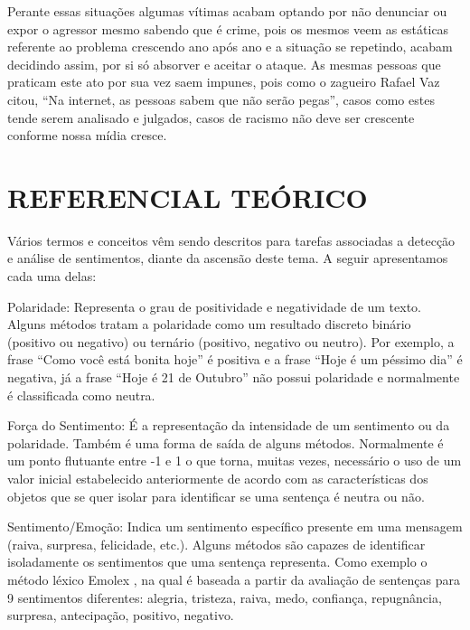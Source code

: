 \documentclass[12pt, a4paper]{article}
\begin{document}
\hspace*{0.8cm}Perante essas situações algumas vítimas acabam optando por não denunciar ou expor o agressor mesmo sabendo que é crime, pois os mesmos veem as estáticas referente ao problema crescendo ano após ano e a situação se repetindo, acabam decidindo assim, por si só absorver e aceitar o ataque.
As mesmas pessoas que praticam este ato por sua vez saem impunes, pois como o zagueiro Rafael Vaz citou, “Na internet, as pessoas sabem que não serão pegas”, casos como estes tende serem analisado e julgados, casos de racismo não deve ser crescente conforme nossa mídia cresce.

\newpage
\section{REFERENCIAL TEÓRICO}	


\hspace*{0.8cm}Vários termos e conceitos vêm sendo descritos para tarefas associadas a detecção e análise de sentimentos, diante da ascensão deste tema. A seguir apresentamos cada uma delas: 

Polaridade: Representa o grau de positividade e negatividade de um texto. Alguns métodos tratam a polaridade como um resultado discreto binário (positivo ou negativo) ou ternário (positivo, negativo ou neutro). Por exemplo, a frase “Como você está bonita hoje” é positiva e a frase “Hoje é um péssimo dia” é negativa, já a frase “Hoje é 21 de Outubro” não possui polaridade e normalmente é classificada como neutra.

Força do Sentimento: É a representação da intensidade de um sentimento ou da polaridade. Também é uma forma de saída de alguns métodos. Normalmente é um ponto flutuante entre -1 e 1 o que torna, muitas vezes, necessário o uso de um valor inicial estabelecido anteriormente de acordo com as características dos objetos que se quer isolar para identificar se uma sentença é neutra ou não.

Sentimento/Emoção: Indica um sentimento específico presente em uma mensagem (raiva, surpresa, felicidade, etc.). Alguns métodos são capazes de identificar isoladamente os sentimentos que uma sentença representa. Como exemplo o método léxico Emolex \cite{Mohammad}, na qual é baseada a partir da avaliação de sentenças para 9 sentimentos diferentes: alegria, tristeza, raiva, medo, confiança, repugnância, surpresa, antecipação, positivo, negativo.
\end{document}
